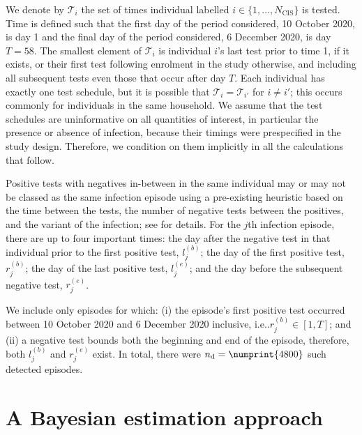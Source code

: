 \documentclass[12pt]{article}
\makeatletter
\newcommand{\ndet}{n_\text{d}}
\newcommand{\Ncis}{N_\text{CIS}}
\newcommand{\sched}{\mathcal{T}}
\DeclareRobustCommand\onedot{\futurelet\@let@token\@onedot}
\def\@onedot{\ifx\@let@token.\else.\null\fi\xspace}
\def\ie{i.e\onedot} \def\Ie{{I.e}\onedot}
\makeatother
\begin{document}
We denote by $\sched_i$ the set of times individual labelled $i \in \{ 1, \dots, \Ncis \}$ is tested.
Time is defined such that the first day of the period considered, 10 October 2020, is day 1 and the final day of the period considered, 6 December 2020, is day $T = 58$.
The smallest element of $\sched_i$ is individual $i$'s last test prior to time 1, if it exists, or their first test following enrolment in the study otherwise, and including all subsequent tests even those that occur after day $T$.
Each individual has exactly one test schedule, but it is possible that $\sched_i = \sched_{i'}$ for $i \neq i'$; this occurs commonly for individuals in the same household.
We assume that the test schedules are uninformative on all quantities of interest, in particular the presence or absence of infection, because their timings were prespecified in the study design.
Therefore, we condition on them implicitly in all the calculations that follow.


Positive tests with negatives in-between in the same individual may or may not be classed as the same infection episode using a pre-existing heuristic based on the time between the tests, the number of negative tests between the positives, and the variant of the infection; see \citet{weiRisk} for details.
For the $j$th infection episode, there are up to four important times: the day after the negative test in that individual prior to the first positive test, $l_j^{(b)}$; the day of the first positive test, $r_j^{(b)}$; the day of the last positive test, $l_j^{(e)}$; and the day before the subsequent negative test, $r_j^{(e)}$.

We include only episodes for which: (i) the episode's first positive test occurred between 10 October 2020 and 6 December 2020 inclusive, \ie $r_j^{(b)} \in [1, T]$; and (ii) a negative test bounds both the beginning and end of the episode,
therefore, both $l_j^{(b)}$ and $r_j^{(e)}$ exist.
In total, there were $\ndet = \numprint{4800}$ such detected episodes.


\section{A Bayesian estimation approach} \label{sec:modelling}
\end{document}
